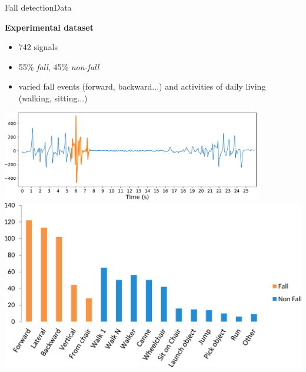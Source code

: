 \documentclass[8pt,t,aspectratio=1610]{beamer}
\begin{document}
\begin{frame}{Fall detection}{Data}
\begin{minipage}[t]{0.49\linewidth}
\begin{overprint}
    \end{overprint}
\end{minipage}\hfill
\begin{minipage}[t]{0.49\linewidth}
\vspace{0pt}
    \pause \pause
    \textbf{Experimental dataset}
    \begin{itemize}
        \item 742 signals
        \item 55\% \emph{fall}, 45\% \emph{non-fall}
        \item varied fall events (forward, backward...) and activities of daily living (walking, sitting...)
    \end{itemize}
    \medskip
    \centering
    \includegraphics[width=0.85\textwidth]{ex_signal_chute_2.pdf}\\
    \includegraphics[width=0.8\linewidth]{exp_database_epure_2.pdf}

\end{minipage}

\end{frame}
\end{document}
